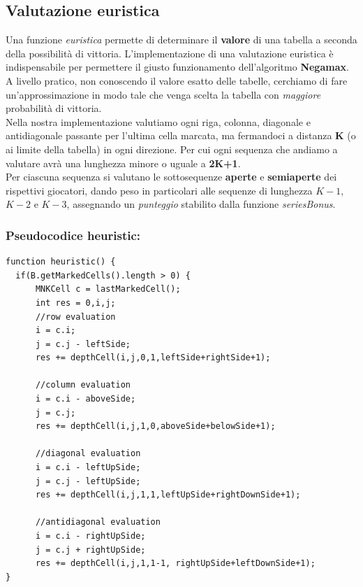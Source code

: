 \documentclass{article}
\begin{document}
    \subsection{Valutazione euristica}
    Una funzione \textit{euristica} permette di determinare il \textbf{valore} di una tabella a seconda della possibilità di vittoria. L'implementazione di una valutazione euristica è indispensabile per permettere il giusto funzionamento dell'algoritmo \textbf{Negamax}.\\
    A livello pratico, non conoscendo il valore esatto delle tabelle, cerchiamo di fare un'approssimazione in modo tale che venga scelta la tabella con \textit{maggiore} probabilità di vittoria.\\
    Nella nostra implementazione valutiamo ogni riga, colonna, diagonale e antidiagonale passante per l'ultima cella marcata, ma fermandoci a distanza \textbf{K} (o ai limite della tabella) in ogni direzione. Per cui ogni sequenza che andiamo a valutare avrà una lunghezza minore o uguale a \textbf{2K+1}.\\ Per ciascuna sequenza si valutano le sottosequenze \textbf{aperte} e \textbf{semiaperte} dei rispettivi giocatori, dando peso in particolari alle sequenze di lunghezza $K-1$, $K-2$ e $K-3$, assegnando un \textit{punteggio} stabilito dalla funzione \textit{seriesBonus}.\\
 
 
     \subsubsection{Pseudocodice heuristic:}
    \lstset{language=java}
    \begin{lstlisting}[frame=single]  
function heuristic() {
  if(B.getMarkedCells().length > 0) {
      MNKCell c = lastMarkedCell();
      int res = 0,i,j;
      //row evaluation
      i = c.i;
      j = c.j - leftSide;
      res += depthCell(i,j,0,1,leftSide+rightSide+1);
      
      //column evaluation
      i = c.i - aboveSide;
      j = c.j;
      res += depthCell(i,j,1,0,aboveSide+belowSide+1);
      
      //diagonal evaluation
      i = c.i - leftUpSide;
      j = c.j - leftUpSide;
      res += depthCell(i,j,1,1,leftUpSide+rightDownSide+1);
      
      //antidiagonal evaluation
      i = c.i - rightUpSide;
      j = c.j + rightUpSide;
      res += depthCell(i,j,1,1-1, rightUpSide+leftDownSide+1);
}
    \end{lstlisting}
    \newpage
\end{document}
